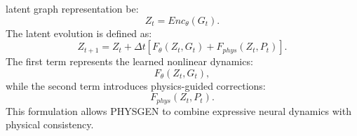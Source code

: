 latent graph representation be: \begin{equation} Z_t = Enc_{\theta}(G_t). \end{equation} The latent evolution is defined as: \begin{equation} Z_{t+1} = Z_t + \Delta t [ F_{\theta}(Z_t,G_t) + F_{phys}(Z_t,P_t) ]. \end{equation} The first term represents the learned nonlinear dynamics: \begin{equation} F_{\theta}(Z_t,G_t), \end{equation} while the second term introduces physics-guided corrections: \begin{equation} F_{phys}(Z_t,P_t). \end{equation} This formulation allows PHYSGEN to combine expressive neural dynamics with physical consistency. %